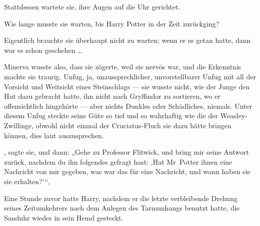 Stattdessen wartete sie, ihre Augen auf die Uhr gerichtet.

Wie lange musste sie warten, bis Harry Potter in der Zeit zurückging?

Eigentlich brauchte sie überhaupt nicht zu warten; wenn er es getan hatte, dann war es schon geschehen …

Minerva wusste also, dass sie zögerte, weil sie nervös war, und die Erkenntnis machte sie traurig. Unfug, ja, unaussprechlicher, unvorstellbarer Unfug mit all der Vorsicht und Weitsicht eines Steinschlags — sie wusste nicht, wie der Junge den Hut dazu gebracht hatte, ihn nicht nach Gryffindor zu sortieren, wo er offensichtlich hingehörte — aber nichts Dunkles oder Schädliches, niemals. Unter diesem Unfug steckte seine Güte so tief und so wahrhaftig wie die der Weasley-Zwillinge, obwohl nicht einmal der Cruciatus-Fluch sie dazu hätte bringen können, dies laut auszusprechen.

, sagte sie, und dann:
„Gehe zu Professor Flitwick, und bring mir seine Antwort zurück, nachdem du ihn folgendes gefragt hast: ‚Hat Mr~Potter ihnen eine Nachricht von mir gegeben, was war das für eine Nachricht, und wann haben sie sie erhalten?‘“,

\later

Eine Stunde zuvor hatte Harry, nachdem er die letzte verbleibende Drehung seines Zeitumkehrers nach dem Anlegen des Tarnumhangs benutzt hatte, die Sanduhr wieder in sein Hemd gesteckt.


